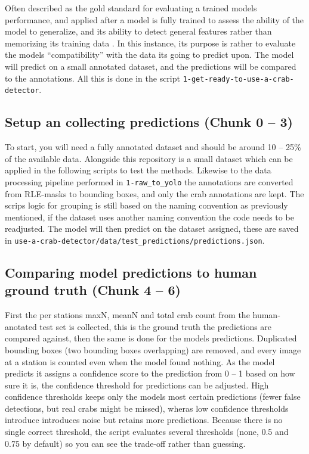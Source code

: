 \documentclass[
]{book}
\newcounter{none} %
\begin{document}
Often described as the gold standard for evaluating a trained models performance, and applied after a model is fully trained to assess the ability of the model to generalize, and its ability to detect general features rather than memorizing its training data \citep{biscarini_deep_2026}. In this instance, its purpose is rather to evaluate the models ``compatibility'' with the data its going to predict upon. The model will predict on a small annotated dataset, and the predictions will be compared to the annotations. All this is done in the script \texttt{1-get-ready-to-use-a-crab-detector}.

\subsection{Setup an collecting predictions (Chunk 0 -- 3)}\label{setup-an-collecting-predictions-chunk-0-3}

To start, you will need a fully annotated dataset and should be around 10 -- 25\% of the available data. Alongside this repository is a small dataset which can be applied in the following scripts to test the methods. Likewise to the data processing pipeline performed in \texttt{1-raw\_to\_yolo} the annotations are converted from RLE-masks to bounding boxes, and only the crab annotations are kept. The scrips logic for grouping is still based on the naming convention as previously mentioned, if the dataset uses another naming convention the code needs to be readjusted. The model will then predict on the dataset assigned, these are saved in \texttt{use-a-crab-detector/data/test\_predictions/predictions.json}.

\subsection{Comparing model predictions to human ground truth (Chunk 4 -- 6)}\label{comparing-model-predictions-to-human-ground-truth-chunk-4-6}

First the per stations maxN, meanN and total crab count from the human-anotated test set is collected, this is the ground truth the predictions are compared against, then the same is done for the models predictions. Duplicated bounding boxes (two bounding boxes overlapping) are removed, and every image at a station is counted even when the model found nothing. As the model predicts it assigns a confidence score to the prediction from 0 -- 1 based on how sure it is, the confidence threshold for predictions can be adjusted. High confidence thresholds keeps only the models most certain predictions (fewer false detections, but real crabs might be missed), wheras low confidence thresholds introduce introduces noise but retains more predictions. Because there is no single correct threshold, the script evaluates several thresholds (none, 0.5 and 0.75 by default) so you can see the trade-off rather than guessing.
\end{document}
